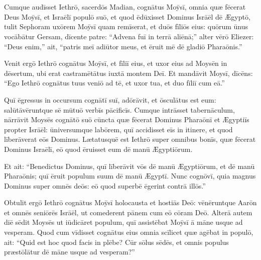 \chapter{}


\thispagestyle{empty}

Cumque audīsset Iethrō, sacerdōs Madian, cognātus Moȳsī,
omnia quæ fēcerat Deus Moȳsī, et Israēlī populō suō, et
quod ēdūxisset Dominus Isrāēl dē Ægyptō, 
tulit Sephoram
uxōrem Moȳsī quam remīserat, 
et duōs fīliōs eius: quōrum ūnus vocābātur
Gersam, dīcente patre: ``Advena fuī in terrā aliēnā;'' 
alter vērō Eliezer:
``Deus enim,'' ait, ``patris meī adiūtor
meus, et ēruit mē dē gladiō Pharaōnis.'' 

Venit ergō Iethrō
cognātus Moȳsī, et fīliī eius, et uxor eius ad Moysēn in
dēsertum, ubi erat castramētātus iuxtā
montem Deī. 
Et mandāvit Moysī, dīcēns: ``Ego Iethrō cognātus tuus veniō
ad tē, et uxor tua, et duo fīliī cum eā.'' 

Quī ēgressus in occursum
cognātī suī, adōrāvit, et ōsculātus est eum:
salūtāvēruntque sē mūtuō verbīs pācificīs. Cumque intrāsset
tabernāculum, 
nārrāvit Moysēs
cognātō suō cūncta quæ fēcerat Dominus
Pharaōnī et Ægyptiīs propter Isrāēl: ūniversumque labōrem,
quī accidisset eīs in itinere, et quod līberāverat eōs Dominus.
Lætatusquē est Iethrō super omnibus bonīs, quæ fēcerat Dominus Israēlī, eō
quod ēruisset eum dē manū Ægyptiōrum. 

Et ait: ``Benedictus Dominus, quī līberāvit vōs dē manū Ægyptiōrum, et dē manū
Pharaōnis; quī ēruit populum suum dē manū Ægyptī. 
Nunc cognōvī, quia
magnus Dominus super omnēs deōs: eō quod superbē ēgerint contrā illōs.''

Obtulit ergō Iethrō cognātus Moȳsī holocausta et hostiās Deō: vēnēruntque Aarōn et omnēs seniōrēs
Isrāēl, ut comederent pānem cum eō cōram
Deō. 
Alterā autem diē sēdit Moysēs ut iūdicāret populum, quī assistēbat Moȳsī ā māne usque
ad vesperam. 
Quod cum vīdisset cognātus
eius omnia scīlicet quæ agēbat in populō, ait: ``Quid est hoc quod facis in
plēbe? Cūr sōlus sēdēs, et omnis populus
præstōlātur dē māne usque ad vesperam?''

